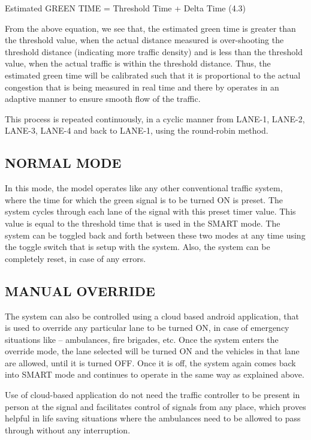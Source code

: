 Estimated GREEN TIME = Threshold Time + Delta Time (4.3)

From the above equation, we see that, the estimated green time is greater than the threshold value, when the actual distance measured is over-shooting the threshold distance (indicating more traffic density) and is less than the threshold value, when the actual traffic is within the threshold distance. Thus, the estimated green time will be calibrated such that it is proportional to the actual congestion that is being measured in real time and there by operates in an adaptive manner to ensure smooth flow of the traffic.

This process is repeated continuously, in a cyclic manner from LANE-1, LANE-2, LANE-3, LANE-4 and back to LANE-1, using the round-robin method.

\pagebreak

\subsection{NORMAL MODE}

In this mode, the model operates like any other conventional traffic system, where the time for which the green signal is to be turned ON is preset. The system cycles through each lane of the signal with this preset timer value. This value is equal to the threshold time that is used in the SMART mode. The system can be toggled back and forth between these two modes at any time using the toggle switch that is setup with the system. Also, the system can be completely reset, in case of any errors.

\subsection{MANUAL OVERRIDE}

The system can also be controlled using a cloud based android application, that is used to override any particular lane to be turned ON, in case of emergency situations like – ambulances, fire brigades, etc. Once the system enters the override mode, the lane selected will be turned ON and the vehicles in that lane are allowed, until it is turned OFF. Once it is off, the system again comes back into SMART mode and continues to operate in the same way as explained above.

Use of cloud-based application do not need the traffic controller to be present in person at the signal and facilitates control of signals from any place, which proves helpful in life saving situations where the ambulances need to be allowed to pass through without any interruption.

